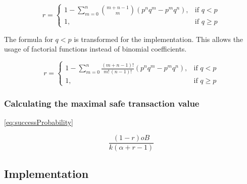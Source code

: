 \begin{equation}
    r = 
\begin{cases}
    1-\sum\limits_{m=0}^n \binom{m+n-1}{m}(p^nq^m-p^mq^n),& \text{if } q < p\\
    1,              & \text{if } q \geq p
\end{cases}
\end{equation}

The formula for $q < p$ is transformed for the implementation. This allows the usage of factorial functions instead of binomial coefficients.

\begin{equation}\label{eq:successProbability}
    r = 
\begin{cases}
    1-\sum\limits_{m=0}^n \frac{(m+n-1)!}{m!\,(n-1)!}(p^nq^m-p^mq^n),& \text{if } q < p\\
    1,              & \text{if } q \geq p
\end{cases}
\end{equation}

\subsubsection{Calculating the maximal safe transaction value  \cite{doublespending}}


\eqref{eq:successProbability}

\begin{equation}
\dfrac{(1 - r) oB}{ k  (\alpha + r - 1)}
\end{equation}

\subsection{Implementation}
